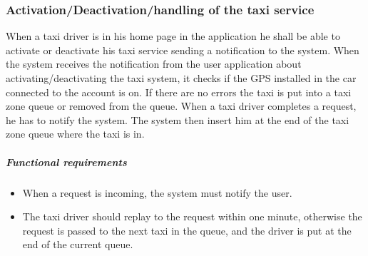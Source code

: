 \subsubsection{Activation/Deactivation/handling of the taxi service}
	When a taxi driver is in his home page in the application he shall be able to activate or deactivate his taxi service sending a notification to the system.
	When the system receives the notification from the user application about activating/deactivating the taxi system, it checks if the GPS installed in the car connected to the account is on. If there are no errors the taxi is put into a taxi zone queue or removed from the queue.
	When a taxi driver completes a request, he has to notify the system. The system then insert him at the end of the taxi zone queue where the taxi is in.
	
	\subparagraph{Functional requirements}
	\begin{itemize}
	    \item When a request is incoming, the system must notify the user.
	    \item The taxi driver should replay to the request within one minute, otherwise the request is passed to the next taxi in the queue, and the driver is put at the end of the current queue.
	\end{itemize} 
	
	
	
		
